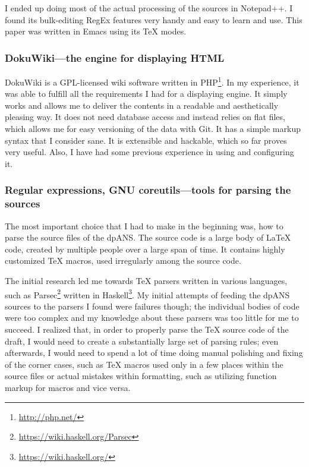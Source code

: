 I ended up doing most of the actual processing of the sources in Notepad++. I found its bulk-editing RegEx features very handy and easy to learn and use. This paper was written in Emacs using its TeX modes.

\subsubsection{DokuWiki---the engine for displaying HTML}

DokuWiki is a GPL-licensed wiki software written in PHP\footnote{\url{http://php.net/}}. In my experience, it was able to fulfill all the requirements I had for a displaying engine. It simply works and allows me to deliver the contents in a readable and aesthetically pleasing way. It does not need database access and instead relies on flat files, which allows me for easy versioning of the data with Git. It has a simple markup syntax that I consider sane. It is extensible and hackable, which so far proves very useful. Also, I have had some previous experience in using and configuring it.

\subsubsection{Regular expressions, GNU coreutils---tools for parsing the sources}

The most important choice that I had to make in the beginning was, how to parse the source files of the dpANS. The source code is a large body of \LaTeX{} code, created by multiple people over a large span of time. It contains highly customized \TeX{} macros, used irregularly among the source code.

The initial research led me towards \TeX{} parsers written in various languages, such as Parsec\footnote{\url{https://wiki.haskell.org/Parsec}} written in Haskell\footnote{\url{https://wiki.haskell.org/}}. My initial attempts of feeding the dpANS sources to the parsers I found were failures though; the individual bodies of code were too complex and my knowledge about these parsers was too little for me to succeed. I realized that, in order to properly parse the \TeX{} source code of the draft, I would need to create a substantially large set of parsing rules; even afterwards, I would need to spend a lot of time doing manual polishing and fixing of the corner cases, such as \TeX{} macros used only in a few places within the source files or actual mistakes within formatting, such as utilizing function markup for macros and vice versa.

